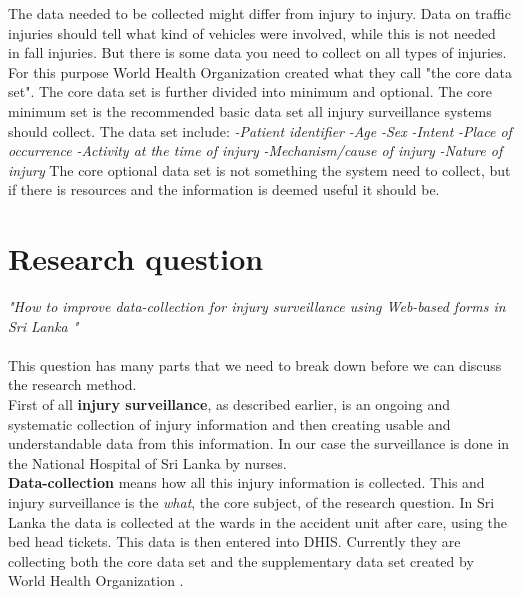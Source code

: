 \documentclass[UKenglish, 12pt]{article}
\newcommand{\WHO}{World Health Organization }
\newcommand{\RQ}{How to improve data-collection for injury surveillance
using Web-based forms in Sri Lanka }
\newcommand{\is}{injury surveillance}
\begin{document}
The data needed to be collected might differ from injury to injury. Data on
traffic injuries should tell what kind of vehicles were involved, while this is
not needed in fall injuries. But there is some data you need to collect on all
types of injuries. For this purpose \WHO created what they call "the core data
set".\cite[25]{who-guide} The core data set is further divided into minimum and
optional. The core minimum set is the recommended basic data set all \is
systems should collect. The data set include:
\newline \emph{-Patient identifier}
\newline \emph{-Age}
\newline \emph{-Sex}
\newline \emph{-Intent}
\newline \emph{-Place of occurrence}
\newline \emph{-Activity at the time of injury}
\newline \emph{-Mechanism/cause of injury}
\newline \emph{-Nature of injury}
\newline The core optional data set is not something
the system need to collect, but if there is resources and the information is
deemed useful it should be. 


\newpage \section*{Research question} 
\textit{"\RQ"} \\\\ This question has
many parts that we need to break down before we can discuss the research
method.\\

First of all \textbf{\is}, as described earlier, is an ongoing and
systematic collection of injury information and then creating usable and
understandable data from this information. In our case the surveillance is done
in the National Hospital of Sri Lanka by nurses. \\

\textbf{Data-collection} means how all this injury information is
collected. This and injury surveillance is the \textit{what}, the core subject, of the
research question. In Sri Lanka the data is collected at the wards in the
accident unit after care, using the bed head tickets. This data is then entered
into DHIS. Currently they are collecting both the core data set and the
supplementary data set created by \WHO.\\
\end{document}
